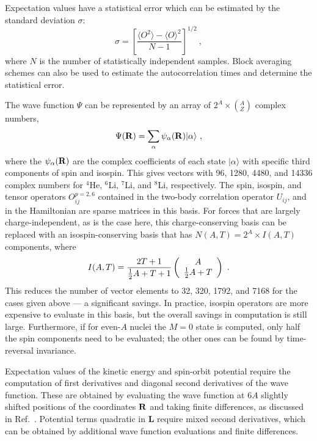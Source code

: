 Expectation values have a statistical error which can be estimated by the
standard deviation $\sigma$:
\begin{equation}
   \sigma = \left[ \frac{ \langle O^2 \rangle - \langle O \rangle ^2}
                        { N-1 } \right] ^{1/2} \ ,
\end{equation}
where $N$ is the number of statistically independent samples.
Block averaging schemes can also be used to estimate the autocorrelation
times and determine the statistical error.

The wave function $\Psi$ can be represented by an array of $2^A \times (^A_Z)$
complex numbers,
\begin{equation}
  \Psi({\bf R}) = \sum_{\alpha} \psi_{\alpha}({\bf R}) |\alpha\rangle \ ,
\label{eq:psivec}
\end{equation}
where the $\psi_{\alpha}({\bf R})$ are the complex coefficients of each state
$|\alpha\rangle$ with specific third components of spin and isospin.
This gives vectors with 96, 1280, 4480, and 14336 complex numbers
for $^4$He, $^6$Li, $^7$Li, and $^8$Li, respectively.
The spin, isospin, and tensor operators $O^{p=2,6}_{ij}$ contained in
the two-body correlation operator $U_{ij}$, and in the Hamiltonian are
sparse matrices in this basis.
For forces that are largely charge-independent, as is the case here,
this charge-conserving basis can be replaced with an isospin-conserving basis
that has $N(A,T) = 2^A \times I(A,T)$ components, where
\begin{equation}
   I(A,T) = \frac{2T+1}{\textstyle{1\over2}A+T+1}
            \left(\begin{array}{c} A \\ \textstyle{1\over2}A+T \end{array}\right) \ .
\label{eq:numiso}
\end{equation}
This reduces the number of vector elements to 32, 320, 1792, and 7168
for the cases given above --- a significant savings.
In practice, isospin operators are more expensive to evaluate
in this basis, but the overall savings in computation is still large.
Furthermore, if for even-$A$ nuclei the $M=0$ state is computed, only
half the spin components need to be evaluated; the other ones can be
found by time-reversal invariance.

Expectation values of the kinetic energy and spin-orbit potential require
the computation of first derivatives and diagonal second derivatives of the
wave function.
These are obtained by evaluating the wave function at $6A$ slightly shifted
positions of the coordinates ${\bf R}$ and taking finite differences,
as discussed in Ref.~\cite{W91}.
Potential terms quadratic in {\bf L} require mixed second derivatives, which
can be obtained by additional wave function evaluations and finite differences.

